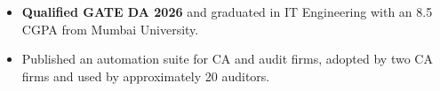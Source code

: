 \begin{itemize}
  \item \textbf{Qualified GATE DA 2026} and graduated in IT Engineering with an 8.5 CGPA from Mumbai University.
  \item Published an automation suite for CA and audit firms, adopted by two CA firms and used by approximately 20 auditors.
\end{itemize}
